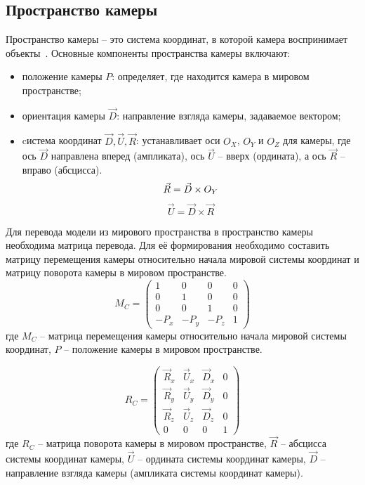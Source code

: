 \subsection{Пространство камеры}

Пространство камеры -- это система координат, в которой камера воспринимает объекты~\cite{lit13, lit14}. Основные компоненты пространства камеры включают:

\begin{itemize}[label=--]
	\item положение камеры $P$: определяет, где находится камера в мировом пространстве;
	\item ориентация камеры $\vec{D}$: направление взгляда камеры, задаваемое вектором;
	\item cистема координат $\vec{D}, \vec{U}, \vec{R}$: устанавливает оси $O_X$, $O_Y$ и $O_Z$ для камеры, где ось $\vec{D}$ направлена вперед (ампликата), ось $\vec{U}$ -- вверх (ордината), а ось $\vec{R}$ -- вправо (абсцисса).
	\begin{equation}
		\vec{R} = \vec{D} \times O_Y \\
	\end{equation}
	\begin{equation}
		\vec{U} = \vec{D} \times \vec{R}
	\end{equation}
\end{itemize}

Для перевода модели из мирового пространства в пространство камеры необходима матрица перевода. Для её формирования необходимо составить матрицу перемещения камеры относительно начала мировой системы координат и матрицу поворота камеры в мировом пространстве.
\begin{equation}
	M_C = 
	\begin{pmatrix}
		1 & 0 & 0 & 0 \\
		0 & 1 & 0 & 0 \\
		0 & 0 & 1 & 0 \\
		-P_x & -P_y & -P_z & 1
	\end{pmatrix}
\end{equation}
где $M_C$ -- матрица перемещения камеры относительно начала мировой системы координат, $P$ -- положение камеры в мировом пространстве.

\begin{equation}
	R_C = 
	\begin{pmatrix}
		\vec{R}_x & \vec{U}_x & \vec{D}_x & 0 \\
		\vec{R}_y & \vec{U}_y & \vec{D}_y & 0 \\
		\vec{R}_z & \vec{U}_z & \vec{D}_z & 0 \\
		0 & 0 & 0 & 1 
	\end{pmatrix}
\end{equation}
где $R_C$ -- матрица поворота камеры в мировом пространстве, $\vec{R}$ -- абсцисса системы координат камеры, $\vec{U}$ -- ордината системы координат камеры, $\vec{D}$ -- направление взгляда камеры (ампликата системы координат камеры).

